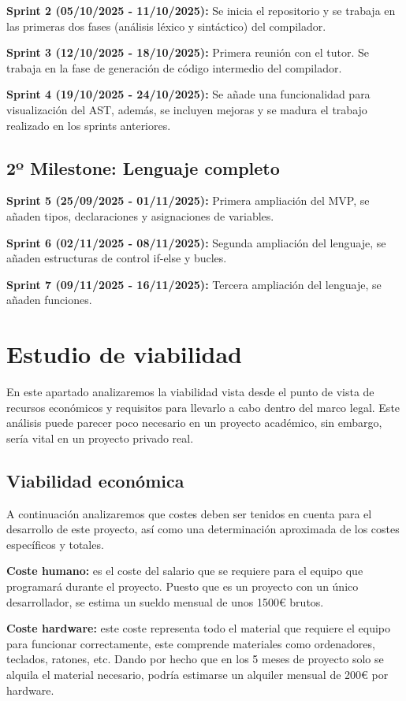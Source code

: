 \textbf{Sprint 2 (05/10/2025 - 11/10/2025):} Se inicia el repositorio y se trabaja en las primeras dos fases (análisis léxico y sintáctico) del compilador.

\textbf{Sprint 3 (12/10/2025 - 18/10/2025):} Primera reunión con el tutor. Se trabaja en la fase de generación de código intermedio del compilador. 

\textbf{Sprint 4 (19/10/2025 - 24/10/2025):} Se añade una funcionalidad para visualización del AST, además, se incluyen mejoras y se madura el trabajo realizado en los sprints anteriores.   

\subsection{2º Milestone: Lenguaje completo}

\textbf{Sprint 5 (25/09/2025 - 01/11/2025):} Primera ampliación del MVP, se añaden tipos, declaraciones y asignaciones de variables.

\textbf{Sprint 6 (02/11/2025 - 08/11/2025):} Segunda ampliación del lenguaje, se añaden estructuras de control if-else y bucles.

\textbf{Sprint 7 (09/11/2025 - 16/11/2025):} Tercera ampliación del lenguaje, se añaden funciones. 

\section{Estudio de viabilidad}
En este apartado analizaremos la viabilidad vista desde el punto de vista de recursos económicos y requisitos para llevarlo a cabo dentro del marco legal. Este análisis puede parecer poco necesario en un proyecto académico, sin embargo, sería vital en un proyecto privado real.

\subsection{Viabilidad económica}
A continuación analizaremos que costes deben ser tenidos en cuenta para el desarrollo de este proyecto, así como una determinación aproximada de los costes específicos y totales.

\textbf{Coste humano:} es el coste del salario que se requiere para el equipo que programará durante el proyecto. Puesto que es un proyecto con un único desarrollador, se estima un sueldo mensual de unos 1500€ brutos.

\textbf{Coste hardware:} este coste representa todo el material que requiere el equipo para funcionar correctamente, este comprende materiales como ordenadores, teclados, ratones, etc. Dando por hecho que en los 5 meses de proyecto solo se alquila el material necesario, podría estimarse un alquiler mensual de 200€ por hardware.

